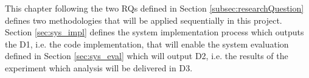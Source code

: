 This chapter following the two \glspl{RQ} defined in Section \ref{subsec:researchQuestion} defines two methodologies that will be applied sequentially in this project. Section \ref{sec:sys_impl} defines the system implementation process which outputs the D1, i.e. the code implementation, that will enable the system evaluation defined in Section \ref{sec:sys_eval} which will output D2, i.e. the results of the experiment which analysis will be delivered in D3.